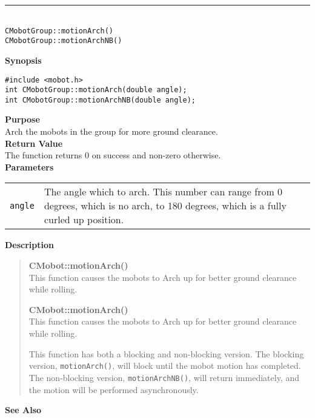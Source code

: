 \noindent
\vspace{5pt}
\rule{4.5in}{0.015in}\\
\noindent
{\LARGE \texttt{CMobotGroup::motionArch()}}\\
{\LARGE \texttt{CMobotGroup::motionArchNB()}}\\
{}

\noindent
{\bf Synopsis}
\vspace{-8pt}
\begin{verbatim}
#include <mobot.h>
int CMobotGroup::motionArch(double angle);
int CMobotGroup::motionArchNB(double angle);
\end{verbatim}

\noindent
{\bf Purpose}\\
Arch the mobots in the group for more ground clearance.\\

\noindent
{\bf Return Value}\\
The function returns 0 on success and non-zero otherwise.\\

\noindent
{\bf Parameters}\\
\vspace{-0.1in}
\begin{description}
\item               
\begin{tabular}{p{10 mm}p{145 mm}}
\texttt{angle} & The angle which to arch. This number can range from 0 degrees, which is
no arch, to 180 degrees, which is a fully curled up position.\\
\end{tabular}
\end{description}

\noindent
{\bf Description}\\
\vspace{-12pt}
\begin{quote}
{\bf CMobot::motionArch()}\\
This function causes the mobots to Arch up for better ground clearance while 
rolling.

{\bf CMobot::motionArch()}\\
This function causes the mobots to Arch up for better ground clearance while 
rolling.

This function has both a blocking and non-blocking version.
The blocking version, \texttt{motionArch()}, will block until the
mobot motion has completed. The non-blocking version, \texttt{motionArchNB()},
will return immediately, and the motion will be performed asynchronously.\\
\end{quote}

\noindent
{\bf See Also}\\


